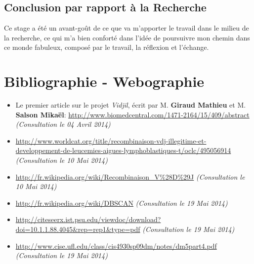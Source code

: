 \documentclass[pdftex,12pt,a4paper]{report}
\begin{document}
\begin{spacing}{1.2}
\section*{Conclusion par rapport à la Recherche}

Ce stage a été un avant-goût de ce que va m'apporter le travail dans le milieu de la recherche, ce qui m'a bien conforté dans l'idée de poursuivre mon chemin dans ce monde fabuleux, composé par le travail, la réflexion et l'échange.

\chapter*{Bibliographie - Webographie}


\begin{itemize}
\item{Le premier article sur le projet \textit{Vidjil}, écrit par M. \textbf{Giraud Mathieu} et M. \textbf{Salson Mikaël}: \url{http://www.biomedcentral.com/1471-2164/15/409/abstract} \textit{(Consultation le 04 Avril 2014)}}
\item{\url{http://www.worldcat.org/title/recombinaison-vdj-illegitime-et-developpement-de-leucemies-aigues-lymphoblastiques-t/oclc/495056914} \textit{(Consultation le 10 Mai 2014)}}
\item{\url{http://fr.wikipedia.org/wiki/Recombinaison_V%28D%29J} \textit{(Consultation le 10 Mai 2014)}}
\item{\url{http://fr.wikipedia.org/wiki/DBSCAN} \textit{(Consultation le 19 Mai 2014)}}
\item{\url{http://citeseerx.ist.psu.edu/viewdoc/download?doi=10.1.1.88.4045&rep=rep1&type=pdf} \textit{(Consultation le 19 Mai 2014)}}
\item{\url{http://www.cise.ufl.edu/class/cis4930sp09dm/notes/dm5part4.pdf} \textit{(Consultation le 19 Mai 2014)}}
\end{itemize}


\end{spacing}
\end{document}
